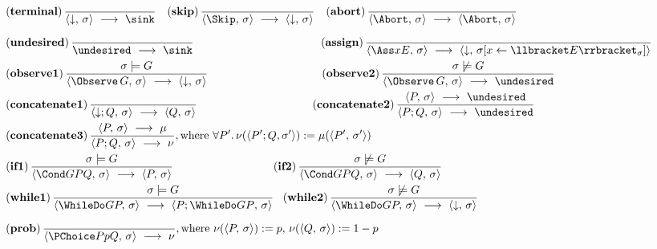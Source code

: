 \begin{figure}[t]
\scriptsize
\begin{align*}
&(\textbf{terminal})\,\frac{\vphantom{\langle}}{\langle {\downarrow},\, \sigma \rangle ~\longrightarrow~ \sink} \quad
(\textbf{skip})\,\frac{\vphantom{\langle}}{\langle \Skip,\, \sigma \rangle ~\longrightarrow~ \langle {\downarrow},\, \sigma \rangle} \quad
(\textbf{abort})\,\frac{\vphantom{\langle}}{\langle \Abort,\, \sigma \rangle ~\longrightarrow~ \langle \Abort,\, \sigma \rangle}\\
&(\textbf{undesired})\,\frac{\vphantom{\langle}}{\undesired ~\longrightarrow~ \sink}\qquad\qquad\qquad\qquad\qquad~~~~
(\textbf{assign})\,\frac{\vphantom{\langle}}{\langle \Ass x E,\, \sigma \rangle ~\longrightarrow~ \langle {\downarrow},\, \sigma[x \leftarrow \llbracket E \rrbracket_\sigma] \rangle}\\
&(\textbf{observe1})\,\frac{\sigma \models G}{\langle \Observe\, G,\, \sigma \rangle ~\longrightarrow~ \langle {\downarrow} ,\, \sigma \rangle}\qquad\qquad\qquad\qquad\qquad\,
(\textbf{observe2})\,\frac{\sigma \not\models G}{\langle \Observe\, G,\, \sigma \rangle ~\longrightarrow~ \undesired}\\
&(\textbf{concatenate1})\,\frac{}{\langle\downarrow;{Q},\, \sigma \rangle ~\longrightarrow~ \langle Q,\, \sigma \rangle}\qquad\qquad\qquad\qquad\qquad\;
(\textbf{concatenate2})\,\frac{\langle P,\, \sigma \rangle ~\longrightarrow~ \undesired}{\langle {P};{Q},\, \sigma \rangle ~\longrightarrow~ \undesired}\\
&(\textbf{concatenate3})\,\frac{\langle P,\, \sigma \rangle ~\longrightarrow~ \mu}{\langle {P};{Q},\, \sigma \rangle ~\longrightarrow~ \nu}, 
\textnormal{where } \forall P'.\,\nu(\langle {P'};{Q}, \sigma'\rangle) := \mu(\langle P',\, \sigma'\rangle)\\
&(\textbf{if1})\,\frac{\sigma \models G}{\langle \Cond G P Q,\, \sigma \rangle ~\longrightarrow~ \langle P,\, \sigma \rangle}\qquad\qquad\qquad\qquad~~\;
(\textbf{if2})\,\frac{\sigma \not\models G}{\langle \Cond G P Q,\, \sigma \rangle ~\longrightarrow~ \langle Q,\, \sigma \rangle}\\
&(\textbf{while1})\,\frac{\sigma \models G}{\langle \WhileDo G P,\, \sigma \rangle ~\longrightarrow~ \langle {P};{\WhileDo G P},\, \sigma \rangle}~~\,
(\textbf{while2})\,\frac{\sigma \not\models G}{\langle \WhileDo G P,\, \sigma \rangle ~\longrightarrow~ \langle {\downarrow},\, \sigma \rangle}\\
&(\textbf{prob})\,\frac{\vphantom{\langle}}{\langle \PChoice P p Q,\, \sigma \rangle ~\longrightarrow~ \nu}, \textnormal{where } \nu(\langle P,\, \sigma\rangle) := p,\, \nu(\langle Q,\, \sigma\rangle) := 1 - p\\

\end{align*}
\end{figure}

